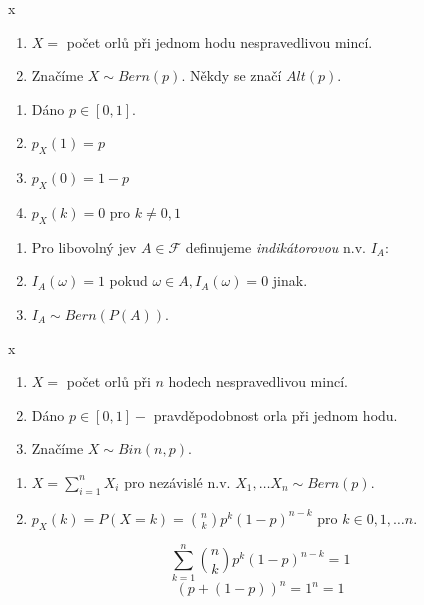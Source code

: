 \documentclass[../main.tex]{subfiles}
\begin{document}
\begin{definition} {\color{white} x}
    \begin{enumerate}
        \item $X = $ počet orlů při jednom hodu nespravedlivou mincí.
        \item Značíme $X \sim Bern(p)$. Někdy se značí $Alt(p)$.
    \end{enumerate}

    \vspace{5mm}

    \begin{enumerate}
        \item Dáno $p \in [0,1]$.
        \item $p_X(1)=p$
        \item $p_X(0) = 1 - p$
        \item $p_X(k) = 0$ pro $k \neq 0,1$
    \end{enumerate}

    \vspace{5mm}

    \begin{enumerate}
        \item Pro libovolný jev $A \in \mathcal{F}$ definujeme \textit{indikátorovou} n.v. $I_A$:
        \item $I_A(\omega) = 1$ pokud $\omega \in A, I_A(\omega) = 0$ jinak.
        \item $I_A \sim  Bern(P(A))$.
    \end{enumerate}
\end{definition}

\begin{definition}
    {\color{white} x}
    \begin{enumerate}
        \item $X = $ počet orlů při $n$ hodech nespravedlivou mincí.
        \item Dáno $p \in [0,1] - $ pravděpodobnost orla při jednom hodu.
        \item Značíme $X \sim Bin(n,p)$. 
    \end{enumerate}
    \begin{enumerate}
        \item $X = \sum^n_{i=1}X_i$ pro nezávislé n.v. $X_1,\dots X_n \sim Bern(p)$.
        \item $p_X(k) = P(X = k) = \binom{n}{k}p^k(1-p)^{n-k}$ pro $k\in {0,1,\dots n}$.
    \end{enumerate}
    \[\sum^n_{k=1}\binom{n}{k}p^k(1-p)^{n-k} = 1\]
    \[(p + (1-p))^n = 1^n = 1\]
\end{definition}
\end{document}
